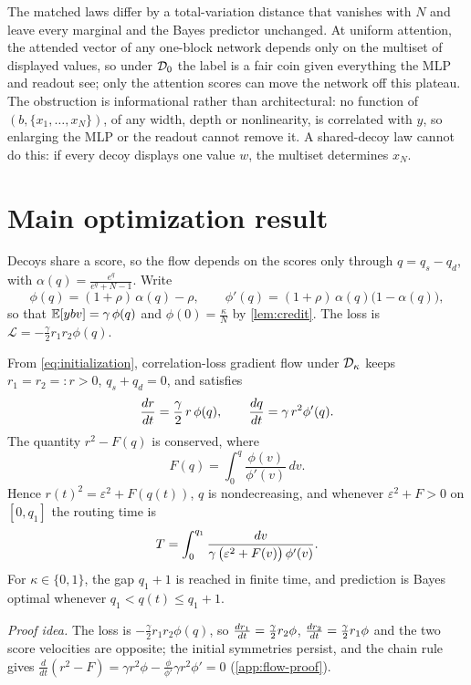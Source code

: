 The matched laws differ by a total-variation distance that vanishes with $N$ and leave every marginal and the Bayes predictor unchanged. At uniform attention, the attended vector
of any one-block network depends only on the multiset of displayed values, so under $\mathcal D_{0}$ the label is a fair coin given everything the MLP and
readout see; only the attention scores can move the network off this plateau.
The obstruction is informational rather than architectural: no function of $(b,\{x_1,\ldots,x_N\})$, of any width, depth or nonlinearity,
is correlated with $y$, so enlarging the MLP or the readout cannot remove it.
A shared-decoy law cannot do this: if every decoy displays one value $w$, the multiset determines $x_N$.

\section{Main optimization result}
\label{sec:dynamics}

Decoys share a score, so the flow depends on the scores only through $q=q_s-q_d$, with
$\alpha(q)=\tfrac{e^q}{e^q+N-1}$. Write
\[
 \phi(q)=(1+\rho)\,\alpha(q)-\rho,\qquad \phi'(q)=(1+\rho)\,\alpha(q)\bigl(1-\alpha(q)\bigr),
\]
so that $\mathbb E[y b v]=\gamma\,\phi(q)$ and $\phi(0)=\tfrac{\kappa}{N}$ by \cref{lem:credit}. The loss is $\mathcal L=-\tfrac{\gamma}{2}r_1r_2\phi(q)$.

\begin{lemma}
\label{lem:invariant}
From \cref{eq:initialization}, correlation-loss gradient flow under $\mathcal D_{\kappa}$ keeps $r_1=r_2=:r>0$, $q_s+q_d=0$, and satisfies
\[
 \frac{d r}{d t}=\frac{\gamma}{2}\,r\,\phi(q),\qquad \frac{d q}{d t}=\gamma\,r^2\phi'(q).
\]
The quantity $r^2-F(q)$ is conserved, where
\[
 F(q)=\int_0^q\frac{\phi(v)}{\phi'(v)}\,dv.
\]
Hence $r(t)^2=\varepsilon^2+F(q(t))$, $q$ is nondecreasing, and whenever $\varepsilon^2+F>0$ on $[0,q_1]$ the routing time is
\begin{equation}
 T=\int_0^{q_1}\frac{dv}{\gamma\,\bigl(\varepsilon^2+F(v)\bigr)\,\phi'(v)}.
 \label{eq:time}
\end{equation}
For $\kappa\in\{0,1\}$, the gap $q_1+1$ is reached in finite time, and prediction is Bayes optimal whenever $q_1<q(t)\le q_1+1$.
\end{lemma}
\emph{Proof idea.} The loss is $-\tfrac{\gamma}{2}r_1r_2\phi(q)$, so $\frac{d r_1}{d t}=\tfrac{\gamma}{2}r_2\phi$, $\frac{d r_2}{d t}=\tfrac{\gamma}{2}r_1\phi$ and the two score
velocities are opposite; the initial symmetries persist, and the chain rule gives $\tfrac{d}{dt}(r^2-F)=\gamma r^2\phi-\tfrac{\phi}{\phi'}\gamma r^2\phi'=0$ (\cref{app:flow-proof}).


